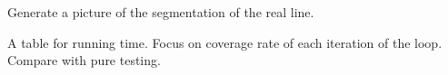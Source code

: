 Generate a picture of the segmentation of the real line.

A table for running time. Focus on coverage rate of each iteration of
the loop. Compare with pure testing.

